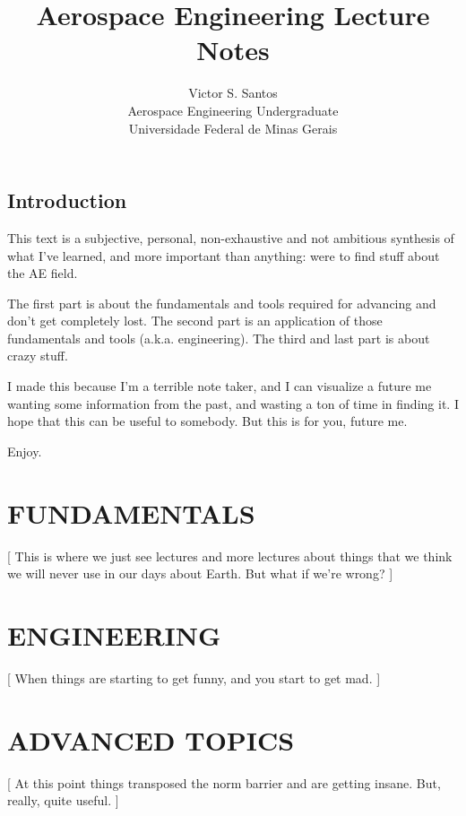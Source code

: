 \documentclass{report}
\author{\uppercase Victor S. Santos \\ Aerospace Engineering Undergraduate \\
 Universidade Federal de Minas Gerais}
\title{\uppercase Aerospace Engineering Lecture Notes}
\begin{document}
\maketitle

\thispagestyle{empty}

\tableofcontents

\frontmatter


\chapter*{Introduction}

This text is a subjective, personal, non-exhaustive and
not ambitious synthesis of what I've learned, and more important than
anything: were to find stuff about the AE field.

The first part is about the fundamentals and tools required for 
advancing and don't get completely lost.
The second part is an application of those fundamentals 
and tools (a.k.a. engineering).
The third and last part is about crazy stuff.

I made this because I'm a terrible note taker, and I can visualize
a future me wanting some information from the past, and wasting
a ton of time in finding it. I hope that this can be useful to
somebody. But this is for you, future me.

Enjoy.

\mainmatter

\part{\uppercase{Fundamentals}}
[
This is where we just see lectures and more lectures about things that
we think we will never use in our days about Earth. But what if we're
wrong?
]


\part{\uppercase{Engineering}}
[
When things are starting to get funny, and you 
start to get mad.
]


\part{\uppercase{Advanced Topics}}
[
At this point things transposed the norm barrier
and are getting insane.
But, really, quite useful.
]



\printindex

\end{document}
